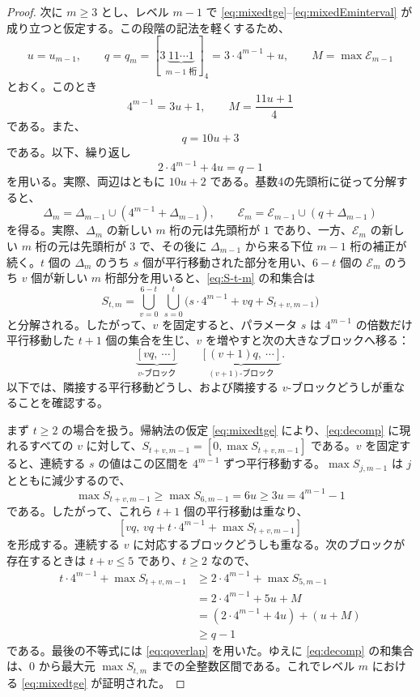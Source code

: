 \documentclass[12pt]{ltjsarticle}
\theoremstyle{plain}
\theoremstyle{definition}
\theoremstyle{plain}
\begin{document}
\begin{proof}
次に $m\geq3$ とし、レベル $m-1$ で \eqref{eq:mixedtge}--\eqref{eq:mixedEminterval} が成り立つと仮定する。この段階の記法を軽くするため、
\[
 u=u_{m-1},\qquad
 q=q_m=[3\underbrace{11\cdots1}_{m-1\text{ 桁}}]_4
      =3\cdot4^{m-1}+u,\qquad
 M=\max\mathcal E_{m-1}
\]
とおく。このとき
\[
 4^{m-1}=3u+1,\qquad
 M=\frac{11u+1}{4}
\]
である。また、
\begin{equation}\label{eq:qmdef}
 q=10u+3
\end{equation}
である。以下、繰り返し
\begin{equation}\label{eq:qoverlap}
 2\cdot4^{m-1}+4u=q-1
\end{equation}
を用いる。実際、両辺はともに $10u+2$ である。基数4の先頭桁に従って分解すると、
\[
 \Delta_m=\Delta_{m-1}\cup(4^{m-1}+\Delta_{m-1}),\qquad
 \mathcal E_m=\mathcal E_{m-1}\cup(q+\Delta_{m-1})
\]
を得る。実際、$\Delta_m$ の新しい $m$ 桁の元は先頭桁が $1$ であり、一方、$\mathcal E_m$ の新しい $m$ 桁の元は先頭桁が $3$ で、その後に $\Delta_{m-1}$ から来る下位 $m-1$ 桁の補正が続く。$t$ 個の $\Delta_m$ のうち $s$ 個が平行移動された部分を用い、$6-t$ 個の $\mathcal E_m$ のうち $v$ 個が新しい $m$ 桁部分を用いると、\eqref{eq:S-t-m} の和集合は
\begin{equation}\label{eq:decomp}
 S_{t,m}=\bigcup_{v=0}^{6-t}\ \bigcup_{s=0}^{t}
 \bigl(s\cdot4^{m-1}+vq+S_{t+v,m-1}\bigr)
\end{equation}
と分解される。したがって、$v$ を固定すると、パラメータ $s$ は $4^{m-1}$ の倍数だけ平行移動した $t+1$ 個の集合を生じ、$v$ を増やすと次の大きなブロックへ移る：
\[
 \underbrace{[vq,\ \cdots]}_{v\text{-ブロック}}
 \qquad
 \underbrace{[(v+1)q,\ \cdots]}_{(v+1)\text{-ブロック}}.
\]
以下では、隣接する平行移動どうし、および隣接する $v$-ブロックどうしが重なることを確認する。

まず $t\geq2$ の場合を扱う。帰納法の仮定 \eqref{eq:mixedtge} により、\eqref{eq:decomp} に現れるすべての $v$ に対して、$S_{t+v,m-1}=[0,\max S_{t+v,m-1}]$ である。$v$ を固定すると、連続する $s$ の値はこの区間を $4^{m-1}$ ずつ平行移動する。$\max S_{j,m-1}$ は $j$ とともに減少するので、
\[
 \max S_{t+v,m-1}\geq\max S_{6,m-1}=6u
     \geq3u=4^{m-1}-1
\]
である。したがって、これら $t+1$ 個の平行移動は重なり、
\[
 [vq,\,vq+t\cdot4^{m-1}+\max S_{t+v,m-1}]
\]
を形成する。連続する $v$ に対応するブロックどうしも重なる。次のブロックが存在するときは $t+v\leq5$ であり、$t\geq2$ なので、
\[
\begin{aligned}
 t\cdot4^{m-1}+\max S_{t+v,m-1}
 &\geq2\cdot4^{m-1}+\max S_{5,m-1}\\
 &=2\cdot4^{m-1}+5u+M\\
 &=(2\cdot4^{m-1}+4u)+(u+M)\\
 &\geq q-1
\end{aligned}
\]
である。最後の不等式には \eqref{eq:qoverlap} を用いた。ゆえに \eqref{eq:decomp} の和集合は、$0$ から最大元 $\max S_{t,m}$ までの全整数区間である。これでレベル $m$ における \eqref{eq:mixedtge} が証明された。


\end{proof}
\end{document}

